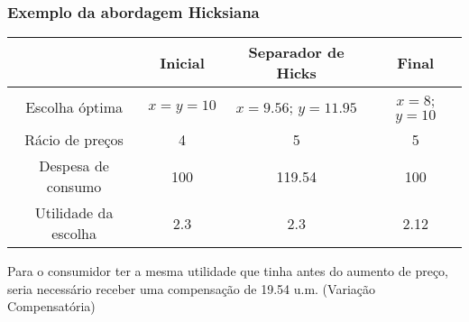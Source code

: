 \begin{frame}
	\frametitle{Exemplo da abordagem Hicksiana}
	{\footnotesize
	\renewcommand{\arraystretch}{2}
	\begin{tabular}{cccc}
	& Inicial & Separador de Hicks & Final \\ \hline
	Escolha \'optima & $x=y=10$ & $x=9.56$; $y=11.95$ & $x=8$; $y=10$\\
	R\'acio de pre\c cos & 4 & 5 & 5 \\
	Despesa de consumo & 100 & 119.54 & 100 \\
	Utilidade da escolha & 2.3 & 2.3 & 2.12
	\end{tabular}
	}

	\vspace{0.5cm}

	Para o consumidor ter a mesma utilidade que tinha antes do aumento de pre\c co, seria necess\'ario receber uma compensa\c c\~ao de 19.54 u.m. (Varia\c c\~ao Compensat\'oria)
\end{frame}

